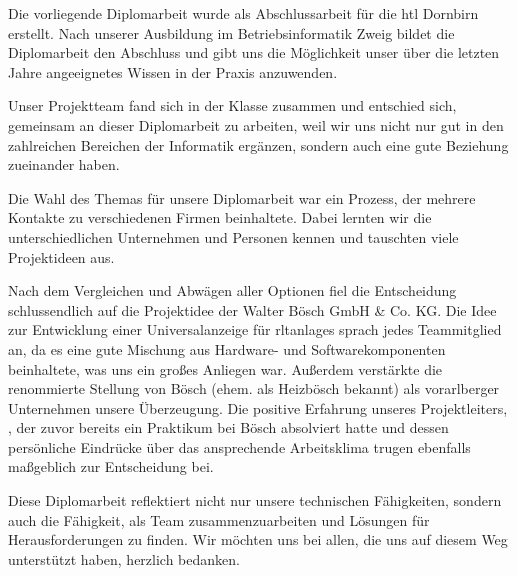 Die vorliegende Diplomarbeit wurde als Abschlussarbeit für die \ac{htl} Dornbirn erstellt. Nach unserer Ausbildung im Betriebsinformatik Zweig bildet die Diplomarbeit den Abschluss und gibt uns die Möglichkeit unser über die letzten Jahre angeeignetes Wissen in der Praxis anzuwenden.

Unser Projektteam fand sich in der Klasse zusammen und entschied sich, gemeinsam an dieser Diplomarbeit zu arbeiten, weil wir uns nicht nur gut in den zahlreichen Bereichen der Informatik ergänzen, sondern auch eine gute Beziehung zueinander haben.

Die Wahl des Themas für unsere Diplomarbeit war ein Prozess, der mehrere Kontakte zu verschiedenen Firmen beinhaltete. Dabei lernten wir die unterschiedlichen Unternehmen und Personen kennen und tauschten viele Projektideen aus.

Nach dem Vergleichen und Abwägen aller Optionen fiel die Entscheidung schlussendlich auf die Projektidee der Walter Bösch GmbH \& Co. KG. Die Idee zur Entwicklung einer Universalanzeige für \aclp{rltanlage} sprach jedes Teammitglied an, da es eine gute Mischung aus Hardware- und Softwarekomponenten beinhaltete, was uns ein großes Anliegen war. Außerdem verstärkte die renommierte Stellung von Bösch (ehem. als Heizbösch bekannt) als vorarlberger Unternehmen unsere Überzeugung. Die positive Erfahrung unseres Projektleiters, \mangeng, der zuvor bereits ein Praktikum bei Bösch absolviert hatte und dessen persönliche Eindrücke über das ansprechende Arbeitsklima trugen ebenfalls maßgeblich zur Entscheidung bei.

Diese Diplomarbeit reflektiert nicht nur unsere technischen Fähigkeiten, sondern auch die Fähigkeit, als Team zusammenzuarbeiten und Lösungen für Herausforderungen zu finden. Wir möchten uns bei allen, die uns auf diesem Weg unterstützt haben, herzlich bedanken.
